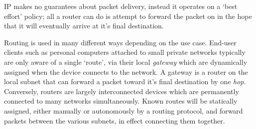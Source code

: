     IP makes no guarantees about packet delivery, instead it operates on a `best effort' policy; all a router can do is attempt to forward the packet on in the hope that it will eventually arrive at it's final destination.

    Routing is used in many different ways depending on the use case. End-user clients such as personal computers attached to small private networks typically are only aware of a single `route', via their local \textit{gateway} which are dynamically assigned when the device connects to the network. A gateway is a router on the local subnet that can forward a packet toward it's final destination by one \textit{hop}.
    Conversely, routers are largely interconnected devices which are permanently connected to many networks simultaneously. Known routes will be statically assigned, either manually or autonomously by a routing protocol, and forward packets between the various subnets, in effect connecting them together.
